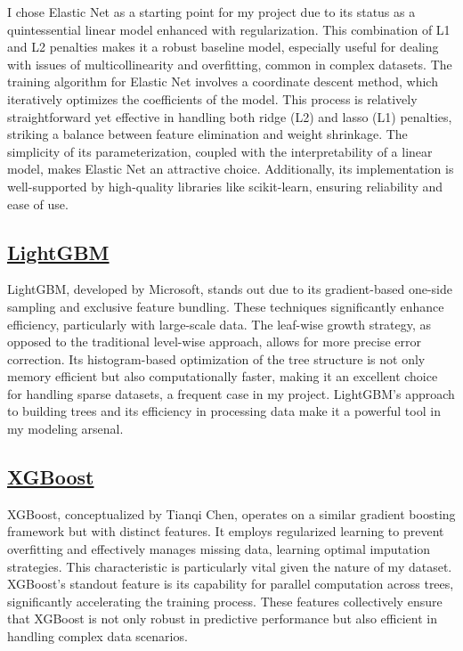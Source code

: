\documentclass[12pt]{article}
\newtheorem{Proof of Lemma}{Proof of Lemma}
\begin{document}
I chose Elastic Net\citep{zou2005regularization} as a starting point for my project due to its status as a quintessential linear model enhanced with regularization. This combination of L1 and L2 penalties makes it a robust baseline model, especially useful for dealing with issues of multicollinearity and overfitting, common in complex datasets. The training algorithm for Elastic Net involves a coordinate descent method, which iteratively optimizes the coefficients of the model. This process is relatively straightforward yet effective in handling both ridge (L2) and lasso (L1) penalties, striking a balance between feature elimination and weight shrinkage. The simplicity of its parameterization, coupled with the interpretability of a linear model, makes Elastic Net an attractive choice. Additionally, its implementation is well-supported by high-quality libraries like scikit-learn\citep{pedregosa2011scikit}, ensuring reliability and ease of use.

\subsection*{\href{https://lightgbm.readthedocs.io/en/stable/index.html}{LightGBM}}
LightGBM, developed by Microsoft\citep{ke2017lightgbm}, stands out due to its gradient-based one-side sampling and exclusive feature bundling. These techniques significantly enhance efficiency, particularly with large-scale data. The leaf-wise growth strategy, as opposed to the traditional level-wise approach, allows for more precise error correction. Its histogram-based optimization of the tree structure is not only memory efficient but also computationally faster, making it an excellent choice for handling sparse datasets, a frequent case in my project. LightGBM's approach to building trees and its efficiency in processing data make it a powerful tool in my modeling arsenal.

\subsection*{\href{https://xgboost.readthedocs.io/en/stable/}{XGBoost}}
XGBoost, conceptualized by Tianqi Chen\citep{chen2016xgboost}, operates on a similar gradient boosting framework but with distinct features. It employs regularized learning to prevent overfitting and effectively manages missing data, learning optimal imputation strategies. This characteristic is particularly vital given the nature of my dataset. XGBoost's standout feature is its capability for parallel computation across trees, significantly accelerating the training process. These features collectively ensure that XGBoost is not only robust in predictive performance but also efficient in handling complex data scenarios.
\end{document}
